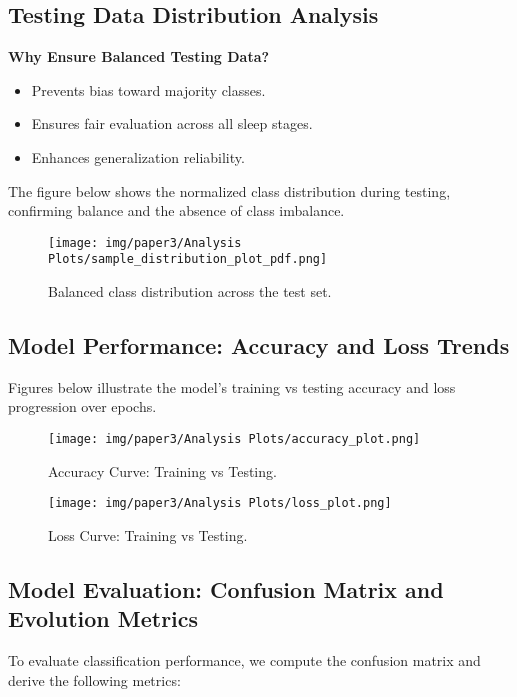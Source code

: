 \subsection{Testing Data Distribution Analysis}

\textbf{Why Ensure Balanced Testing Data?}
\begin{itemize}
	\item Prevents bias toward majority classes.
	\item Ensures fair evaluation across all sleep stages.
	\item Enhances generalization reliability.
\end{itemize}

The figure below shows the normalized class distribution during testing, confirming balance and the absence of class imbalance.

\begin{figure}[H]
	\centering
	\texttt{[image: img/paper3/Analysis Plots/sample\_distribution\_plot\_pdf.png]}
	\caption{Balanced class distribution across the test set.}
\end{figure}

\subsection{Model Performance: Accuracy and Loss Trends}

Figures below illustrate the model's training vs testing accuracy and loss progression over epochs.

\begin{figure}[H]
	\centering
	\texttt{[image: img/paper3/Analysis Plots/accuracy\_plot.png]}
	\caption{Accuracy Curve: Training vs Testing.}
\end{figure}

\begin{figure}[H]
	\centering
	\texttt{[image: img/paper3/Analysis Plots/loss\_plot.png]}
	\caption{Loss Curve: Training vs Testing.}
\end{figure}

\subsection{Model Evaluation: Confusion Matrix and Evolution Metrics}

To evaluate classification performance, we compute the confusion matrix and derive the following metrics:

